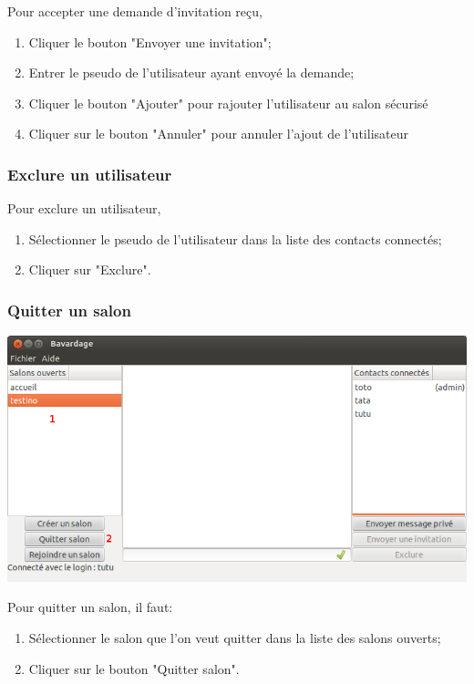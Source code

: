 \documentclass[a4paper,11pt,french]{book}
\begin{document}
Pour accepter une demande d'invitation reçu,
\begin{enumerate}
    \item Cliquer le bouton "Envoyer une invitation";
    \item Entrer le pseudo de l'utilisateur ayant envoyé la demande;
    \item Cliquer le bouton "Ajouter" pour rajouter l'utilisateur au salon sécurisé
    \item Cliquer sur le bouton "Annuler" pour annuler l'ajout de l'utilisateur
\end{enumerate}

\subsubsection{Exclure un utilisateur}
Pour exclure un utilisateur,
\begin{enumerate}
    \item Sélectionner le pseudo de l'utilisateur dans la liste des contacts connectés;
    \item Cliquer sur "Exclure".
\end{enumerate}
\newpage

\subsubsection{Quitter un salon}

\includegraphics[width=40em]{capture/quit_room.png}

Pour quitter un salon, il faut:

\begin{enumerate}
    \item Sélectionner le salon que l'on veut quitter dans la liste des salons ouverts;
    \item Cliquer sur le bouton "Quitter salon".

\end{enumerate}
\end{document}
